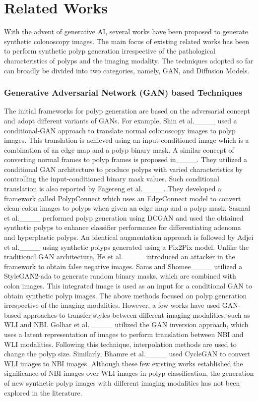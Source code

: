 \section{Related Works}
With the advent of generative AI, several works have been proposed to generate synthetic colonoscopy images. The main focus of existing related works has been to perform synthetic polyp generation irrespective of the pathological characteristics of polyps and the imaging modality. The techniques adopted so far can broadly be divided into two categories, namely, GAN, and Diffusion Models.  

\subsubsection*{Generative Adversarial Network (GAN) based Techniques}
The initial frameworks for polyp generation are based on the adversarial concept and adopt different variants of GANs. For example, Shin et al.____ used a conditional-GAN approach to translate normal colonoscopy images to polyp images. This translation is achieved using an input-conditioned image which is a combination of an edge map and a polyp binary mask. A similar concept of converting normal frames to polyp frames is proposed in____. They utilized a conditional GAN architecture to produce polyps with varied characteristics by controlling the input-conditioned binary mask values. Such conditional translation is also reported by Fagereng et al.____. They developed a framework called PolypConnect which uses an EdgeConnect model to convert clean colon images to polyps when given an edge map and a polyp mask. Sasmal et al.____ performed polyp generation using DCGAN and used the obtained synthetic polyps to enhance classifier performance for differentiating adenoma and hyperplastic polyps. An identical augmentation approach is followed by Adjei et al.____ using synthetic polyps generated using a Pix2Pix model. Unlike the traditional GAN architecture, He et al.____ introduced an attacker in the framework to obtain false negative images. Sams and Shomee____ utilized a StyleGAN2-ada to generate random binary masks, which are combined with colon images. This integrated image is used as an input for a conditional GAN to obtain synthetic polyp images. The above methods focused on polyp generation irrespective of the imaging modalities. However, a few works have used GAN-based approaches to transfer styles between different imaging modalities, such as WLI and NBI. Golhar et al. ____ utilized the GAN inversion approach, which uses a latent representation of images to perform translation between NBI and WLI modalities. Following this technique, interpolation methods are used to change the polyp size. Similarly, Bhamre et al.____ used CycleGAN to convert WLI images to NBI images. Although these few existing works established the significance of NBI images over WLI images in polyp classification, the generation of new synthetic polyp images with different imaging modalities has not been explored in the literature.      


